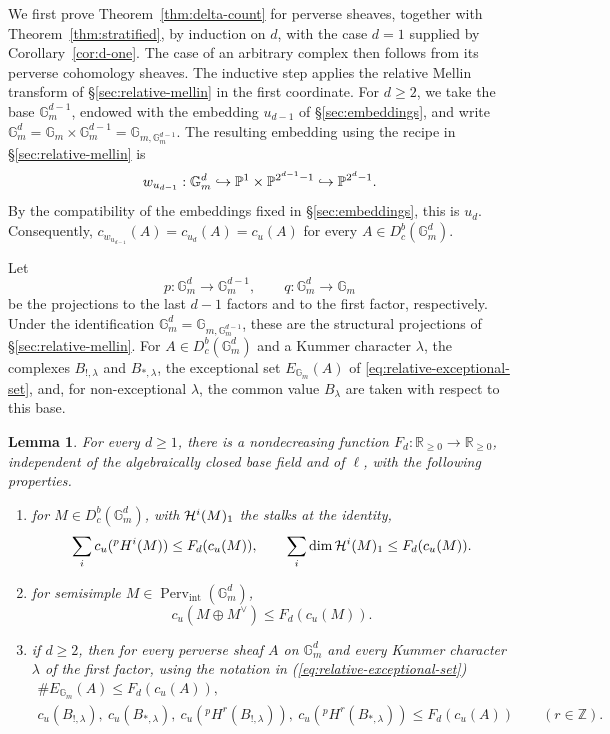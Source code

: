 \documentclass[12pt,reqno]{amsart}
\theoremstyle{definition}
\theoremstyle{plain}
\newtheorem{lem}[para]{Lemma}
\theoremstyle{definition}
\theoremstyle{remark}
\newcommand{\bbG}{\mathbb{G}}  \newcommand{\bbH}{\mathbb{H}}
\newcommand{\Db}{D^b_c}
\newcommand{\Gm}{\bbG_m}
\newcommand{\Perv}{\operatorname{Perv}}
\newcommand{\cu}{c_u}
\begin{document}
We first prove Theorem~\ref{thm:delta-count} for perverse sheaves, together with
Theorem~\ref{thm:stratified}, by induction on \(d\), with the case \(d=1\) supplied by
Corollary~\ref{cor:d-one}.  The case of an arbitrary complex then follows from its perverse cohomology
sheaves.  The inductive step applies the relative Mellin transform of \S\ref{sec:relative-mellin} in the
first coordinate.  For \(d\ge2\), we take the base
\(\Gm^{d-1}\), endowed with the embedding \(u_{d-1}\) of \S\ref{sec:embeddings}, and write
\(\Gm^d=\Gm\times\Gm^{d-1}=\bbG_{m,\Gm^{d-1}}\).
The resulting embedding using the recipe in \S\ref{sec:relative-mellin} is
\[
 w_{u_{d-1}}:\Gm^d\hookrightarrow\bbP^1\times\bbP^{2^{d-1}-1}
 \hookrightarrow\bbP^{2^d-1}.
\]
By the compatibility of the embeddings fixed in \S\ref{sec:embeddings}, this is \(u_d\).
Consequently, \(c_{w_{u_{d-1}}}(A)=c_{u_d}(A)=\cu(A)\) for every \(A\in\Db(\Gm^d)\).

Let
\begin{equation}
\label{eq:coordinate-projections}
 p:\Gm^d\longrightarrow\Gm^{d-1},\qquad
 q:\Gm^d\longrightarrow\Gm
\end{equation}
be the projections to the last \(d-1\) factors and to the first factor, respectively.  Under the
identification \(\Gm^d=\bbG_{m,\Gm^{d-1}}\), these are the structural projections of
\S\ref{sec:relative-mellin}.  For \(A\in\Db(\Gm^d)\) and a Kummer character \(\lambda\), the complexes
\(B_{!,\lambda}\) and \(B_{*,\lambda}\), the exceptional set \(E_{\Gm}(A)\) of
\eqref{eq:relative-exceptional-set}, and, for non-exceptional \(\lambda\), the common value
\(B_\lambda\) are taken with respect to this base.
\begin{lem}
\label{lem:complexity-bounds}
For every \(d\ge1\), there is a nondecreasing function
\(F_{d}:\mathbb R_{\ge0}\to\mathbb R_{\ge0}\), independent of the algebraically closed base field and of
\(\ell\), with the following properties.
\begin{enumerate}
\item[(i)] for \(M\in\Db(\Gm^d)\), with \(\mathcal{H}^i(M)_1\) the stalks at the identity,
\[
        \sum_i\cu({}^pH^i(M))\le F_{d}(\cu(M)),\qquad
        \sum_i\dim\cH^i(M)_1\le F_{d}(\cu(M)).
\]
\item[(ii)] for semisimple \(M\in\Perv_{\mathrm{int}}(\Gm^d)\),
\[
        \cu(M\oplus M^\vee)\le F_{d}(\cu(M)).
\]
\item[(iii)] if \(d\ge2\), then for every perverse sheaf \(A\) on \(\Gm^d\) and every Kummer character
\(\lambda\) of the first factor, using the notation in (\ref{eq:relative-exceptional-set})
\[
\begin{gathered}
        \#E_{\Gm}(A)\le F_{d}(\cu(A)),\\
        \cu(B_{!,\lambda}),\ \cu(B_{*,\lambda}),\
        \cu({}^pH^r(B_{!,\lambda})),\ \cu({}^pH^r(B_{*,\lambda}))
        \le F_{d}(\cu(A))
        \qquad(r\in\mathbb Z).
\end{gathered}
\]
\end{enumerate}
\end{lem}
\end{document}

